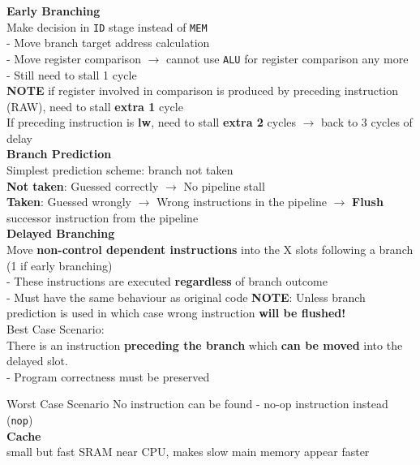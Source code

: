 \documentclass[10pt, a4paper]{article}
\newcommand{\highlight}[1]{{\color{red}\textbf{#1}}}
\begin{document}
\begin{multicols*}{3}
		\textbf{Early Branching}\\
		Make decision in \texttt{ID} stage instead of \texttt{MEM}\\
		- Move branch target address calculation\\
		- Move register comparison $\rightarrow$ cannot use \texttt{ALU} for register comparison any more\\
		- Still need to stall 1 cycle\\
		\highlight{NOTE} if register involved in comparison is produced by preceding instruction (RAW), need to stall \highlight{extra 1} cycle\\
		If preceding instruction is \highlight{lw}, need to stall \highlight{extra 2} cycles $\rightarrow$ back to 3 cycles of delay\\
		
		\textbf{Branch Prediction}\\
		Simplest prediction scheme: branch not taken\\
		\highlight{Not taken}: Guessed correctly $\rightarrow$ No pipeline stall\\
		\highlight{Taken}: Guessed wrongly $\rightarrow$ Wrong instructions in the pipeline $\rightarrow$ \textbf{Flush} successor instruction from the pipeline\\
		
		\textbf{Delayed Branching}\\
		Move \textbf{non-control dependent instructions} into the X slots following a branch (1 if early branching)\\
		- These instructions are executed \textbf{regardless} of branch outcome\\
		- Must have the same behaviour as original code
		\highlight{NOTE}: Unless branch prediction is used in which case wrong instruction \textbf{will be flushed!}\\
		
		Best Case Scenario:\\
		There is an instruction \textbf{preceding the branch} which \textbf{can be moved} into the delayed slot.\\
		- Program correctness must be preserved
		
		Worst Case Scenario
		No instruction can be found
		- no-op instruction instead (\texttt{nop})\\

		{\normalsize\textbf{Cache}}\\
		small but fast SRAM near CPU, makes slow main memory appear faster\\


\end{multicols*}
\end{document}
